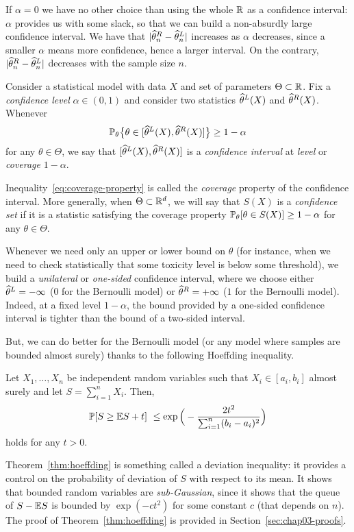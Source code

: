 If $\alpha = 0$ we have no other choice than using the whole $\R$ as a confidence interval: $\alpha$  provides us with some slack, so that we can build a non-absurdly large confidence interval. 
We have that $|\wh \theta_n^R - \wh \theta_n^L|$ increases as $\alpha$ decreases, since a smaller $\alpha$ means more confidence, hence a larger interval.
On the contrary, $|\wh \theta_n^R - \wh \theta_n^L|$ decreases with the sample size $n$.
\begin{definition}
	Consider a statistical model with data $X$ and set of parameters $\Theta \subset \R$. 
	Fix a \emph{confidence level} $\alpha \in (0, 1)$ and consider two statistics $\wh \theta^L(X)$ and $\wh \theta^R(X)$. Whenever 
	\begin{equation}
		\label{eq:coverage-property}
		\P_\theta \big\{ \theta \in [\wh \theta^L(X), \wh \theta^R(X)] \big\} \geq 1 - \alpha
	\end{equation}
	for any $\theta \in \Theta$, we say that $[\wh \theta^L(X), \wh \theta^R(X)]$ is a \emph{confidence interval} at \emph{level} or \emph{coverage} $1 - \alpha$.
\end{definition}
Inequality~\eqref{eq:coverage-property} is called the \emph{coverage} property of the confidence interval.
More generally, when $\Theta \subset \R^d$, we will say that $S(X)$ is a \emph{confidence set} if it is a statistic satisfying the coverage property $\P_\theta[ \theta \in S(X) ] \geq 1 - \alpha$ for any $\theta \in \Theta$.
\begin{remark}
	Whenever we need only an upper or lower bound on $\theta$ (for instance, when we need to check statistically that some toxicity level is below some threshold), we build a \emph{unilateral} or \emph{one-sided} confidence interval, where we choose either $\wh \theta^L = -\infty$ ($0$ for the Bernoulli model) or $\wh \theta^R = +\infty$ ($1$ for the Bernoulli model).
	Indeed, at a fixed level $1 - \alpha$, the bound provided by a one-sided confidence interval is tighter than the bound of a two-sided interval. 
\end{remark}
But, we can do better for the Bernoulli model (or any model where samples are bounded almost surely) thanks to the following Hoeffding inequality.
\begin{theorem}[Hoeffding]
	\label{thm:hoeffding}
	Let $X_1, \ldots, X_n$ be independent random variables such that $X_i \in [a_i, b_i]$ almost surely and let $S = \sum_{i=1}^n X_i$. Then,
	\begin{equation*}
		\P[ S \geq \E S + t] \leq \exp\Big( - \frac{2 t^2}{\sum_{i=1}^n (b_i - a_i)^2} \Big)
	\end{equation*}
	holds for any $t >0$.
\end{theorem}
Theorem~\ref{thm:hoeffding} is something called a deviation inequality: it provides a control on the probability of deviation of $S$ with respect to its mean.
It shows that bounded random variables are \emph{sub-Gaussian}, since it shows that the queue of $S - \E S$ is bounded by $\exp(-c t^2)$ for some constant $c$ (that depends on $n$).
The proof of Theorem~\ref{thm:hoeffding} is provided in Section~\ref{sec:chap03-proofs}.

